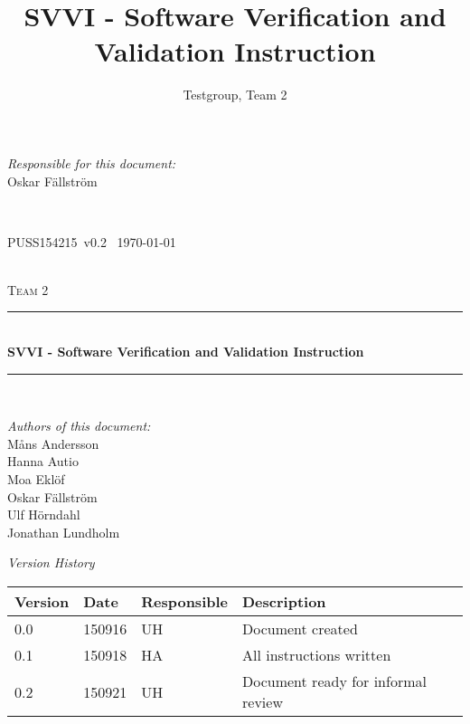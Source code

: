 \documentclass[a4paper]{article}
\title{SVVI - Software Verification and Validation Instruction}
\author{Testgroup, Team 2}
\newcommand{\version}{v0.2}
\newcommand{\SVVI}{PUSS154215}
\begin{document}
\begin{titlepage}
\newcommand{\HRule}{\rule{\linewidth}{0.5mm}}

\begin{minipage}{0.5\textwidth}
\begin{flushleft} %
\textit{Responsible for this document:}\\
Oskar Fällström %
\end{flushleft}
\end{minipage}
~
\begin{minipage}{0.4\textwidth}
\begin{flushright}
\SVVI\ \version\ %
\today
\end{flushright}
\end{minipage}\\[3cm]

\centering
\textsc{\LARGE Team 2}\\[0.5cm]

\HRule \\[0.4cm]
{ \huge \bfseries SVVI - Software Verification and Validation Instruction }\\[0.4cm] %
\HRule \\[1.5cm]

\vfill
\begin{flushleft}
\textit{Authors of this document:}\\
Måns Andersson \\
Hanna Autio \\
Moa Eklöf \\
Oskar Fällström \\
Ulf Hörndahl \\
Jonathan Lundholm
\end{flushleft}


\end{titlepage}

\begin{center}
\textit{\large Version History}

    \begin{tabular}{ | l | l | l | p{5cm} |}
    \hline
    \textbf{Version}		& \textbf{Date}		& \textbf{Responsible}					& \textbf{Description}					\\ \hline
    0.0						& 150916 			& UH									& Document created						\\ \hline
    0.1						& 150918			& HA									& All instructions written				\\ \hline
    0.2						& 150921			& UH									& Document ready for informal review \\ \hline
    \end{tabular}
\end{center}
\end{document}
